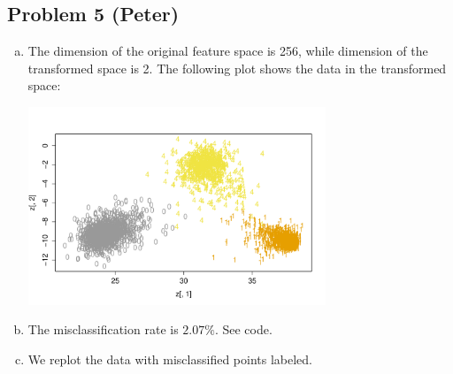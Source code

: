 \documentclass[12pt]{article}
\newcommand{\1}{\mathbbm{1}}
\begin{document}
\newpage
\subsection{Problem 5 (Peter)}
\begin{enumerate}[(a)]
\item The dimension of the original feature space is 256, while dimension of the transformed space is 2. The following plot shows the data in the transformed space:
\begin{center}
\includegraphics[width=3.5in]{prob5_a_1.pdf}
\end{center}

\item The misclassification rate is $2.07\%$. See code.
\item We replot the data with misclassified points labeled.


\end{enumerate}
\end{document}
